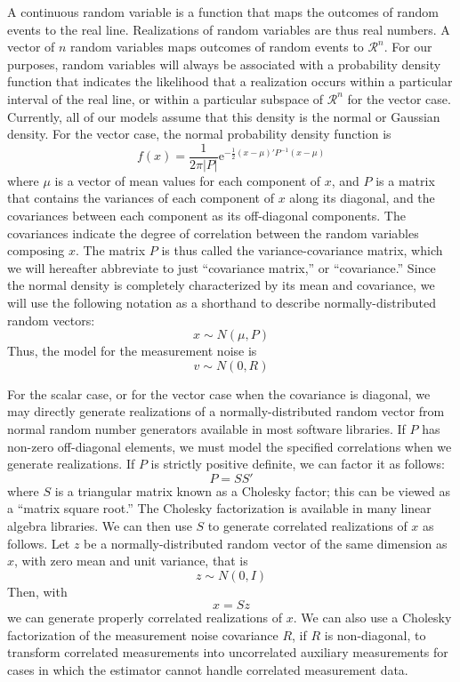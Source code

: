 A continuous random variable is a function that maps the outcomes of random events to the real line.  Realizations of random variables are thus real numbers.  A vector of $n$ random variables maps outcomes of random events to $\mathcal{R}^n$.  For our purposes, random variables will always be associated with a probability density function that indicates the likelihood that a realization occurs within a particular interval of the real line, or within a particular subspace of $\mathcal{R}^n$ for the vector case.  Currently, all of our models assume that this density is the normal or Gaussian density.  For the vector case, the normal probability density function is
\begin{equation}
	f(x) = \frac{1}{2\pi|P|}\text{e}^{-\frac{1}{2}(x-\mu)'P^{-1}(x-\mu)}
\end{equation}
where $\mu$ is a vector of mean values for each component of $x$, and $P$ is a matrix that contains the variances of each component of $x$ along its diagonal, and the covariances between each component as its off-diagonal components.  The covariances indicate the degree of correlation between the random variables composing $x$.  The matrix $P$ is thus called the variance-covariance matrix, which we will hereafter abbreviate to just ``covariance matrix,'' or ``covariance.''  Since the normal density is completely characterized by its mean and covariance, we will use the following notation as a shorthand to describe normally-distributed random vectors:
\begin{equation}
	x \sim N(\mu, P)
\end{equation}
Thus, the model for the measurement noise is
\begin{equation}
	v \sim N(0, R)
\end{equation}

For the scalar case, or for the vector case when the covariance is diagonal, we may directly generate realizations of a normally-distributed random vector from normal random number generators available in most software libraries.  If $P$ has non-zero off-diagonal elements, we must model the specified correlations when we generate realizations.  If $P$ is strictly positive definite, we can factor it as follows:
\begin{equation}
	P = SS'
\end{equation}
where $S$ is a triangular matrix known as a Cholesky factor; this can be viewed as a ``matrix square root.''  The Cholesky factorization is available in many linear algebra libraries.  We can then use $S$ to generate correlated realizations of $x$ as follows.  Let $z$ be a normally-distributed random vector of the same dimension as $x$, with zero mean and unit variance, that is
\begin{equation}
	z \sim N(0,I)
\end{equation}
Then, with
\begin{equation}
	x = S z
\end{equation}
we can generate properly correlated realizations of $x$.  We can also use a Cholesky factorization of the measurement noise covariance $R$, if $R$ is non-diagonal, to transform correlated measurements into uncorrelated auxiliary measurements for cases in which the estimator cannot handle correlated measurement data.

